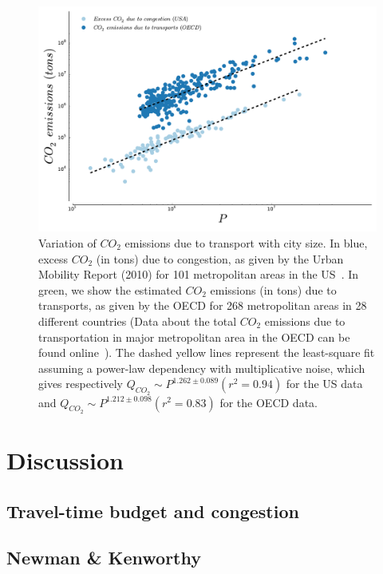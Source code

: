 \begin{figure}
\includegraphics[width=0.9\linewidth]{gfx/chapter-scaling/scaling_co2.pdf}
\caption{Variation of $CO_2$ emissions due to transport with city size. In blue, excess $CO_2$ (in tons) due to congestion, as given by the Urban Mobility Report (2010) for 101 metropolitan areas in the US~\cite{DataUSA2}. In green, we show the estimated $CO_2$ emissions (in tons) due to transports, as given by the OECD for 268 metropolitan areas in 28 different countries (Data about the total $CO_2$ emissions due to transportation in major metropolitan area in the OECD can be found online~\cite{OECD}). The dashed yellow lines represent the least-square fit assuming a power-law dependency with multiplicative noise, which gives respectively $Q_{CO_2} \sim P^{1.262 \pm 0.089} (r^2=0.94)$ for the US data and $Q_{CO_2} \sim P^{1.212 \pm 0.098} (r^2=0.83)$ for the OECD data.}
\end{figure}



\section{Discussion}

\subsection{Travel-time budget and congestion}

\subsection{Newman \& Kenworthy}

